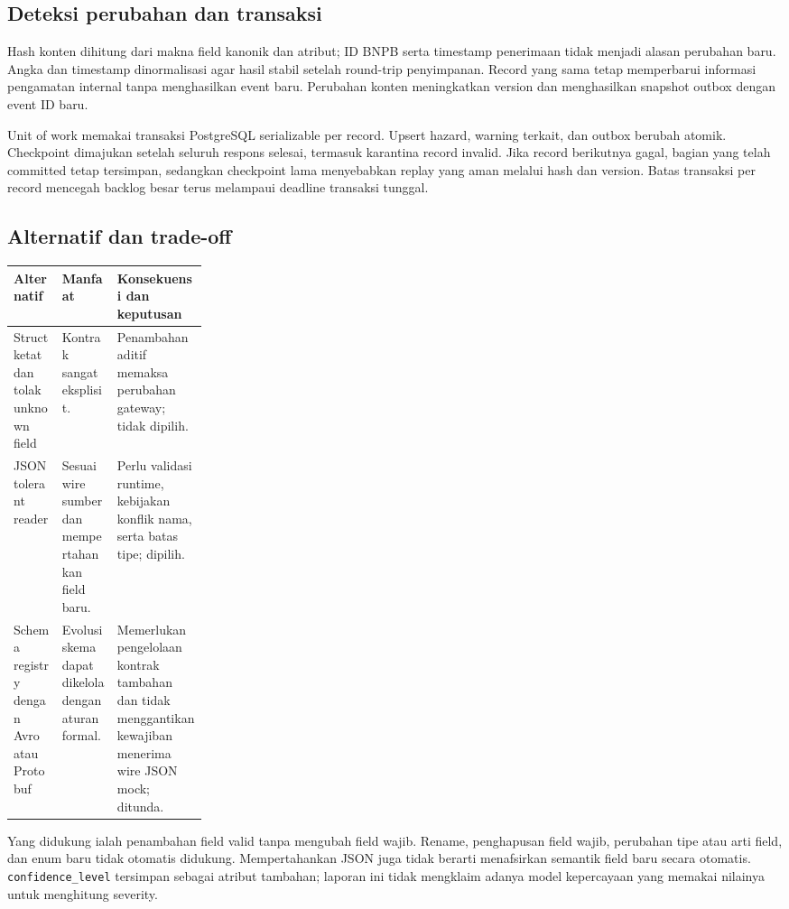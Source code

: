 \subsection{Deteksi perubahan dan transaksi}
Hash konten dihitung dari makna field kanonik dan atribut; ID BNPB serta timestamp penerimaan tidak menjadi alasan perubahan baru. Angka dan timestamp dinormalisasi agar hasil stabil setelah round-trip penyimpanan. Record yang sama tetap memperbarui informasi pengamatan internal tanpa menghasilkan event baru. Perubahan konten meningkatkan version dan menghasilkan snapshot outbox dengan event ID baru.

Unit of work memakai transaksi PostgreSQL serializable per record. Upsert hazard, warning terkait, dan outbox berubah atomik. Checkpoint dimajukan setelah seluruh respons selesai, termasuk karantina record invalid. Jika record berikutnya gagal, bagian yang telah committed tetap tersimpan, sedangkan checkpoint lama menyebabkan replay yang aman melalui hash dan version. Batas transaksi per record mencegah backlog besar terus melampaui deadline transaksi tunggal.


\subsection{Alternatif dan trade-off}
\begin{tabularx}{\linewidth}{P{0.25\linewidth}YY}
\toprule Alternatif & Manfaat & Konsekuensi dan keputusan\\\midrule
Struct ketat dan tolak unknown field & Kontrak sangat eksplisit. & Penambahan aditif memaksa perubahan gateway; tidak dipilih.\\
JSON tolerant reader & Sesuai wire sumber dan mempertahankan field baru. & Perlu validasi runtime, kebijakan konflik nama, serta batas tipe; dipilih.\\
Schema registry dengan Avro atau Protobuf & Evolusi skema dapat dikelola dengan aturan formal. & Memerlukan pengelolaan kontrak tambahan dan tidak menggantikan kewajiban menerima wire JSON mock; ditunda.\\
\bottomrule
\end{tabularx}

Yang didukung ialah penambahan field valid tanpa mengubah field wajib. Rename, penghapusan field wajib, perubahan tipe atau arti field, dan enum baru tidak otomatis didukung. Mempertahankan JSON juga tidak berarti menafsirkan semantik field baru secara otomatis. \texttt{confidence\_level} tersimpan sebagai atribut tambahan; laporan ini tidak mengklaim adanya model kepercayaan yang memakai nilainya untuk menghitung severity.

